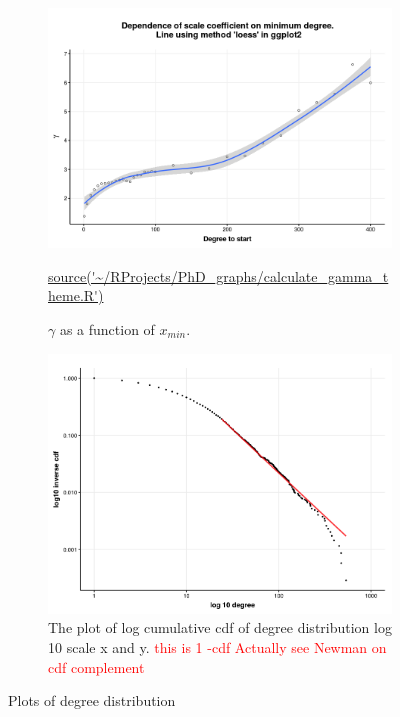 \begin{figure}
    \centering
    \begin{subfigure}[t]{0.45\textwidth}
        \centering
        \includegraphics[width=\linewidth]{images/chapter3/poweRlaw/Rplot_gamma_theme.png} 
     \caption[$\gamma$ as function of $x_{min}$]{$\gamma$ as a function of $x_{min}$. }
    \tiny\url{source('~/RProjects/PhD_graphs/calculate_gamma_theme.R')}
        \label{fig:gamma}
    \end{subfigure}
    \hfill
    \begin{subfigure}[t]{0.45\textwidth}
        \centering
        \includegraphics[width=\linewidth]{images/chapter3/ggplot2/theme/powerlaw/Rplot01_chapter3_cdf_and_powerlaw.png} 
        \caption{The plot of log cumulative cdf of degree distribution log 10 scale x and y. \textcolor{red}{this is 1 -cdf Actually see Newman on cdf complement}} \label{fig:log_degree_distribution}
    \end{subfigure}
    \caption{Plots of degree distribution}
    \label{fig:Plots of degree distribution}
\end{figure}



